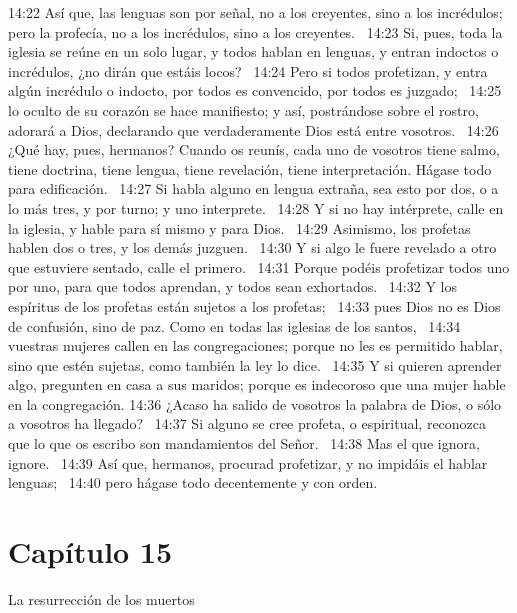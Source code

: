 14:22 Así que, las lenguas son por señal, no a los creyentes, sino a los incrédulos; pero la profecía, no a los incrédulos, sino a los creyentes.  
14:23 Si, pues, toda la iglesia se reúne en un solo lugar, y todos hablan en lenguas, y entran indoctos o incrédulos, ¿no dirán que estáis locos?  
14:24 Pero si todos profetizan, y entra algún incrédulo o indocto, por todos es convencido, por todos es juzgado;  
14:25 lo oculto de su corazón se hace manifiesto; y así, postrándose sobre el rostro, adorará a Dios, declarando que verdaderamente Dios está entre vosotros.  
14:26 ¿Qué hay, pues, hermanos? Cuando os reunís, cada uno de vosotros tiene salmo, tiene doctrina, tiene lengua, tiene revelación, tiene interpretación. Hágase todo para edificación.  
14:27 Si habla alguno en lengua extraña, sea esto por dos, o a lo más tres, y por turno; y uno interprete.  
14:28 Y si no hay intérprete, calle en la iglesia, y hable para sí mismo y para Dios.  
14:29 Asimismo, los profetas hablen dos o tres, y los demás juzguen.  
14:30 Y si algo le fuere revelado a otro que estuviere sentado, calle el primero.  
14:31 Porque podéis profetizar todos uno por uno, para que todos aprendan, y todos sean exhortados.  
14:32 Y los espíritus de los profetas están sujetos a los profetas;  
14:33 pues Dios no es Dios de confusión, sino de paz. Como en todas las iglesias de los santos,  
14:34 vuestras mujeres callen en las congregaciones; porque no les es permitido hablar, sino que estén sujetas, como también la ley lo dice.  
14:35 Y si quieren aprender algo, pregunten en casa a sus maridos; porque es indecoroso que una mujer hable en la congregación. 
14:36 ¿Acaso ha salido de vosotros la palabra de Dios, o sólo a vosotros ha llegado?  
14:37 Si alguno se cree profeta, o espiritual, reconozca que lo que os escribo son mandamientos del Señor.  
14:38 Mas el que ignora, ignore.  
14:39 Así que, hermanos, procurad profetizar, y no impidáis el hablar lenguas;  
14:40 pero hágase todo decentemente y con orden.  
\section*{Capítulo 15}
La resurrección de los muertos  

